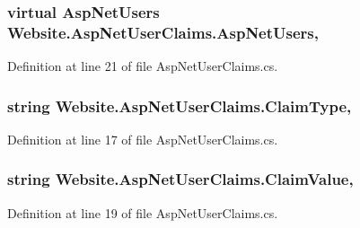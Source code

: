 \subsubsection[{Asp\+Net\+Users}]{\setlength{\rightskip}{0pt plus 5cm}virtual {\bf Asp\+Net\+Users} Website.\+Asp\+Net\+User\+Claims.\+Asp\+Net\+Users\hspace{0.3cm}{\ttfamily [get]}, {\ttfamily [set]}}\label{class_website_1_1_asp_net_user_claims_a419dcbf398f01c760a824ec67610159d}


Definition at line 21 of file Asp\+Net\+User\+Claims.\+cs.

\hypertarget{class_website_1_1_asp_net_user_claims_a51a3cbc00317136901b60aa49d3384d6}{}
\subsubsection[{Claim\+Type}]{\setlength{\rightskip}{0pt plus 5cm}string Website.\+Asp\+Net\+User\+Claims.\+Claim\+Type\hspace{0.3cm}{\ttfamily [get]}, {\ttfamily [set]}}\label{class_website_1_1_asp_net_user_claims_a51a3cbc00317136901b60aa49d3384d6}


Definition at line 17 of file Asp\+Net\+User\+Claims.\+cs.

\hypertarget{class_website_1_1_asp_net_user_claims_ad52314b997f96e61f5afc14a580dd39a}{}
\subsubsection[{Claim\+Value}]{\setlength{\rightskip}{0pt plus 5cm}string Website.\+Asp\+Net\+User\+Claims.\+Claim\+Value\hspace{0.3cm}{\ttfamily [get]}, {\ttfamily [set]}}\label{class_website_1_1_asp_net_user_claims_ad52314b997f96e61f5afc14a580dd39a}


Definition at line 19 of file Asp\+Net\+User\+Claims.\+cs.

\hypertarget{class_website_1_1_asp_net_user_claims_a987bf13aa51a358fa466df3a75b25201}{}
